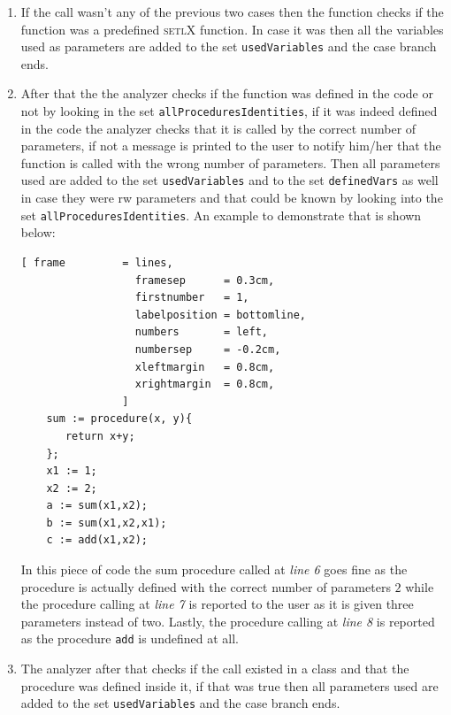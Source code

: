\documentclass[11pt]{report}
\begin{document}
\begin{enumerate}
\item If the call wasn't any of the previous two cases then the function checks if the function was a predefined \textsc{setlX} function. In case it was then all the variables used as parameters are added to the set \texttt{usedVariables} and the case branch ends.

\item After that the the analyzer checks if the function was defined in the code or not by looking in the set \texttt{allProceduresIdentities}, if it was indeed defined in the code the analyzer checks that it is called by the correct number of parameters, if not a message is printed to the user to notify him/her that the function is called with the wrong number of parameters. Then all parameters used are added to the set \texttt{usedVariables} and to the set \texttt{definedVars} as well in case they were rw parameters and that could be known by looking into the set \texttt{allProceduresIdentities}. An example to demonstrate that is shown below:
\begin{Verbatim}[ frame         = lines, 
                  framesep      = 0.3cm, 
                  firstnumber   = 1,
                  labelposition = bottomline,
                  numbers       = left,
                  numbersep     = -0.2cm,
                  xleftmargin   = 0.8cm,
                  xrightmargin  = 0.8cm,
                ]
    sum := procedure(x, y){
       return x+y;
    };
    x1 := 1;
    x2 := 2;
    a := sum(x1,x2);
    b := sum(x1,x2,x1);
    c := add(x1,x2);
\end{Verbatim}
In this piece of code the sum procedure called at \textsl{line 6} goes fine as the procedure is actually defined with the correct number of parameters $2$ while the procedure calling at \textsl{line 7} is reported to the user as it is given three parameters instead of two. Lastly, the procedure calling at \textsl{line 8} is reported as the procedure \texttt{add} is undefined at all.

\item The analyzer after that checks if the call existed in a class and that the procedure was defined inside it, if that was true then all parameters used are added to the set \texttt{usedVariables} and the case branch ends.


\end{enumerate}
\end{document}
